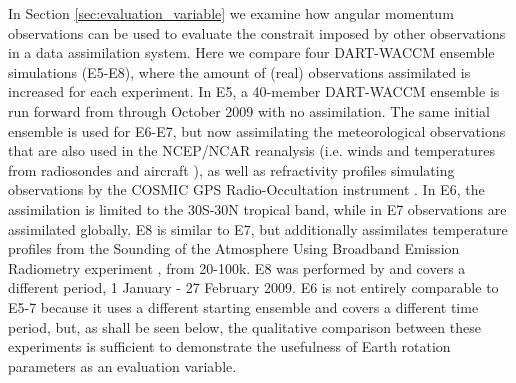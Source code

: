 In Section \ref{sec:evaluation_variable} we examine how angular momentum observations can be used to evaluate the constrait imposed by other observations in a data assimilation system.  
Here we compare four DART-WACCM ensemble simulations (E5-E8), where the amount of (real) observations assimilated is increased for each experiment. 
In E5, a 40-member DART-WACCM ensemble is run forward from through October 2009 with no assimilation.  
The same initial ensemble is used for E6-E7, but now assimilating the meteorological observations that are also used in the NCEP/NCAR reanalysis (i.e. winds and temperatures from radiosondes and aircraft \citep{Saha2010}), as well as refractivity profiles simulating observations by the COSMIC GPS Radio-Occultation instrument \citep{Anthes2008}.
In E6, the assimilation is limited to the 30S-30N tropical band, while in E7 observations are assimilated globally. 
E8 is similar to E7, but additionally assimilates temperature profiles from the Sounding of the Atmosphere Using Broadband Emission Radiometry experiment \citep[SABER]{Russell2009}, from 20-100k.
E8 was performed by \citet{Pedatella2014} and covers a different period, 1 January - 27 February 2009.  
E6 is not entirely comparable to E5-7 because it uses a different starting ensemble and covers a different time period, but, as shall be seen below, the qualitative comparison between these experiments is sufficient to demonstrate the usefulness of Earth rotation parameters as an evaluation variable. 

